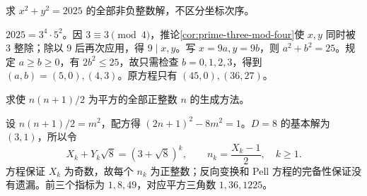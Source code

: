 \begin{example}[平方和的全部表示]
求 $x^2+y^2=2025$ 的全部非负整数解，不区分坐标次序。
\end{example}
\begin{solve}
$2025=3^4\cdot5^2$。因 $3\equiv3\pmod4$，推论\ref{cor:prime-three-mod-four}使 $x,y$ 同时被 $3$ 整除；除以 $9$ 后再次应用，得 $9\mid x,y$。写 $x=9a,y=9b$，则 $a^2+b^2=25$。规定 $a\ge b\ge0$，有 $2b^2\le25$，故只需检查 $b=0,1,2,3$，得到 $(a,b)=(5,0),(4,3)$。原方程只有 $(45,0),(36,27)$。
\end{solve}

\begin{example}[平方三角数]
求使 $n(n+1)/2$ 为平方的全部正整数 $n$ 的生成方法。
\end{example}
\begin{solve}
设 $n(n+1)/2=m^2$，配方得 $(2n+1)^2-8m^2=1$。$D=8$ 的基本解为 $(3,1)$，所以令
\[
 X_k+Y_k\sqrt8=(3+\sqrt8)^k,\qquad
 n_k=\frac{X_k-1}{2},\quad k\ge1.
\]
方程保证 $X_k$ 为奇数，故每个 $n_k$ 为正整数；反向变换和 Pell 方程的完备性保证没有遗漏。前三个指标为 $1,8,49$，对应平方三角数 $1,36,1225$。
\end{solve}

